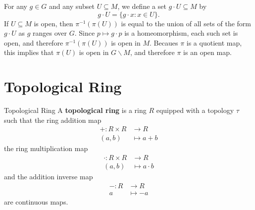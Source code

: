 \begin{prf}
	For any $g \in G$ and any subset $U \subseteq M$, we define a set $g \cdot U \subseteq M$ by
$$
g \cdot U=\{g \cdot x: x \in U\} .
$$
If $U \subseteq M$ is open, then $\pi^{-1}(\pi(U))$ is equal to the union of all sets of the form $g \cdot U$ as $g$ ranges over $G$. Since $p \mapsto g \cdot p$ is a homeomorphism, each such set is open, and therefore $\pi^{-1}(\pi(U))$ is open in $M$. Becaues $\pi$ is a quotient map, this implies that $\pi(U)$ is open in $G\backslash M$, and therefore $\pi$ is an open map.
\end{prf}




\section{Topological Ring}
\begin{definition}{Topological Ring}{}
    A \textbf{topological ring} is a ring $R$ equipped with a topology $\tau$ such that the ring addition map
    \begin{align*}
        +:R\times R&\longrightarrow R\\
        (a,b)&\longmapsto a+b
    \end{align*}
    the ring multiplication map
    \begin{align*}
        \cdot:R\times R&\longrightarrow R\\
        (a,b)&\longmapsto a\cdot b
    \end{align*}
    and the addition inverse map
    \begin{align*}
        -:R&\longrightarrow R\\
        a&\longmapsto -a
    \end{align*}
    are continuous maps.
\end{definition}

